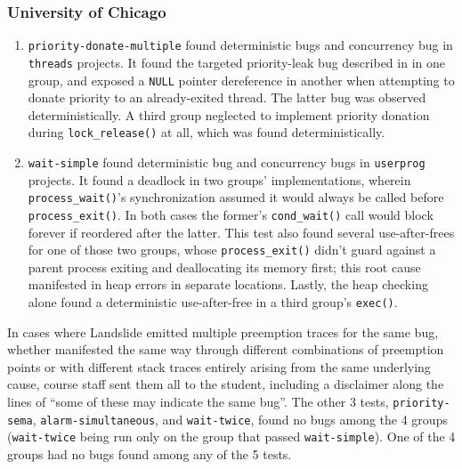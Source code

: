 \subsubsection{University of Chicago}
\label{sec:education-eval-bugs-uc}


\begin{enumerate}
	\item {\tt priority-donate-multiple} found 
		deterministic bugs and  concurrency bug in {\tt threads} projects.
		It found the targeted priority-leak bug
		described in \sect{\ref{sec:education-pintos-tests}} in one group,
		and exposed a {\tt NULL} pointer dereference in another
		when attempting to donate priority to an already-exited thread.
		The latter bug was observed deterministically.
		A third group neglected to implement priority donation during {\tt lock\_release()} at all,
		which was found deterministically.
	\item {\tt wait-simple} found  deterministic bug
		and  concurrency bugs in {\tt userprog} projects.
		It found a deadlock in two groups' implementations,
		wherein {\tt process\_wait()}'s synchronization assumed
		it would always be called before {\tt process\_exit()}.
		In both cases the former's {\tt cond\_wait()} call would block forever if reordered after the latter.
		This test also found several use-after-frees for one of those two groups,
		whose {\tt process\_exit()} didn't guard against a parent process exiting and deallocating its memory first;
		this root cause manifested in heap errors in  separate locations.
		Lastly, the heap checking alone found a deterministic use-after-free in a third group's {\tt exec()}.
\end{enumerate}

In cases where Landslide emitted multiple preemption traces for the same bug,
whether manifested the same way through different combinations of preemption points
or with different stack traces entirely arising from the same underlying cause,
course staff sent them all to the student,
including a disclaimer along the lines of ``some of these may indicate the same bug''.
%
The other 3 tests, {\tt priority-sema}, {\tt alarm-simultaneous}, and {\tt wait-twice},
found no bugs among the 4 groups
({\tt wait-twice} being run only on the group that passed {\tt wait-simple}).
One of the 4 groups had no bugs found among any of the 5 tests.

